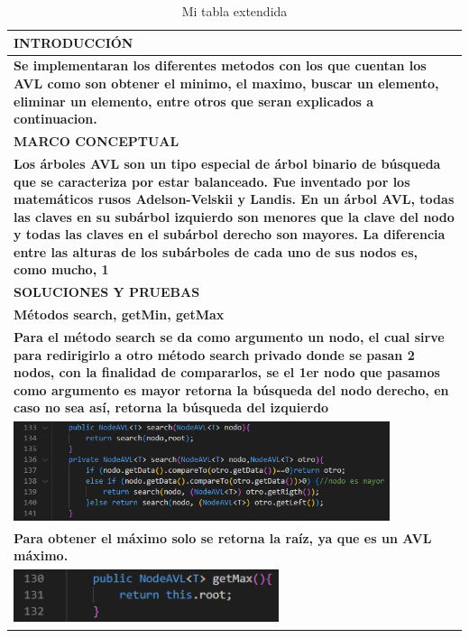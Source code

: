 \documentclass[9pt]{article}
\begin{document}
	\begin{longtable}{|p{15cm}|}
		\caption{Mi tabla extendida}\\
		\hline 
		\rowcolor{tablebackground}
		\color{white}\textbf{INTRODUCCIÓN}  \\
		\hline 
		\textbf{Se implementaran los diferentes metodos con los que cuentan los AVL
		como son obtener el minimo, el maximo, buscar un elemento, eliminar un elemento,
		entre otros que seran explicados a continuacion.}  \\
		\hline 
		\rowcolor{tablebackground}
		\color{white}\textbf{MARCO CONCEPTUAL}  \\
		\hline 
		\textbf{Los árboles AVL son un tipo especial de árbol binario 
		de búsqueda que se caracteriza por estar balanceado. 
		Fue inventado por los matemáticos rusos Adelson-Velskii y Landis.
		 En un árbol AVL, todas las claves en su subárbol izquierdo 
		 son menores que la clave del nodo y todas las claves en el
		  subárbol derecho son mayores. La diferencia entre las alturas
		   de los subárboles de cada uno de sus nodos es, como mucho, 1}  \\
		\hline 
		\rowcolor{tablebackground}
		\color{white}\textbf{SOLUCIONES Y PRUEBAS}  \\
		\hline 
		\textbf{Métodos search, getMin, getMax}\\
		\textbf{Para el método search se da como argumento un nodo,
		 el cual sirve para redirigirlo a otro método search privado 
		 donde se pasan 2 nodos, con la finalidad de compararlos, 
		 se el 1er nodo que pasamos como argumento es mayor retorna
		  la búsqueda del nodo derecho, en caso no sea así, retorna
		   la búsqueda del izquierdo}\\
		\includegraphics[width=0.85\textwidth,keepaspectratio]{img/search.png}\\
		\textbf{Para obtener el máximo solo se retorna la raíz, ya que es un AVL máximo.		}\\
		\includegraphics[width=0.6\textwidth,keepaspectratio]{img/getMax.png}\\

\end{longtable}
\end{document}
